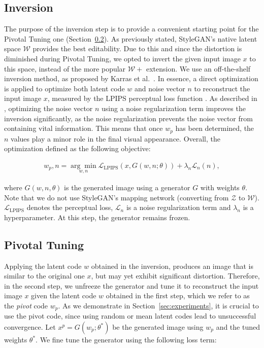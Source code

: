 \subsection{Inversion}

The purpose of the inversion step is to provide a convenient starting point for the Pivotal Tuning one (Section~\ref{sec:pivotalTuning}). As previously stated, StyleGAN's native latent space $\mathcal{W}$ provides the best editability. Due to this and since the distortion is diminished during Pivotal Tuning, we opted to invert the given input image $x$ to this space, instead of the more popular $\mathcal{W}+$ extension. We use an off-the-shelf inversion method, as proposed by Karras et al.~\cite{karras2020analyzing}. In essence, a direct optimization is applied to optimize both latent code $w$ and noise vector $n$ to reconstruct the input image $x$, measured by the LPIPS perceptual loss function \cite{zhang2018unreasonable}. As described in \cite{karras2020analyzing}, optimizing the noise vector $n$ using a noise regularization term improves the inversion significantly, as the noise regularization prevents the noise vector from containing vital information. This means that once $w_p$ has been determined, the $n$ values play a minor role in the final visual appearance. Overall, the optimization defined as the following objective:

\begin{align}
w_p, n = \underset{w, n}{\arg\min} \mathcal{L}_{\text{LPIPS}}(x, G(w, n; \theta)) + \lambda_{n}\mathcal{L}_{n}(n),
\end{align}

where $G(w, n, \theta)$ is the generated image using a generator $G$ with weights $\theta$. Note that we do not use StyleGAN's mapping network (converting from $\mathcal{Z}$ to $\mathcal{W}$). $\mathcal{L}_{\text{LPIPS}}$ denotes the perceptual loss, $\mathcal{L}_{n}$ is a noise regularization term and $\lambda_{n}$ is a hyperparameter. At this step, the generator remains frozen.

\subsection{Pivotal Tuning}
\label{sec:pivotalTuning}

Applying the latent code $w$ obtained in the inversion, produces an image that is similar to the original one $x$, but may yet exhibit significant distortion. Therefore, in the second step, we unfreeze the generator and tune it to reconstruct the input image $x$ given the latent code $w$ obtained in the first step, which we refer to as the \textit{pivot} code $w_p$. As we demonstrate in Section~\ref{sec:experiments}, it is crucial to use the pivot code, since using random or mean latent codes lead to unsuccessful convergence. Let $x^{p} = G(w_p; \theta^*)$ be the generated image using $w_p$ and the tuned weights $\theta^*$. We fine tune the generator using the following loss term:

